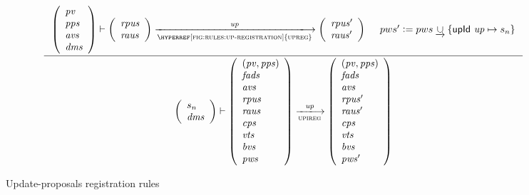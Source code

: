 \begin{figure}[htb]
  \begin{equation}
    \label{eq:rule:upi-reg-interface}
    \inference
    {
      {\left(
        \begin{array}{l}
          \var{pv}\\
          \var{pps}\\
          \var{avs}\\
          \var{dms}
        \end{array}
      \right)}
      \vdash
      {
        \left(
          \begin{array}{l}
            \var{rpus}\\
            \var{raus}
          \end{array}
        \right)
      }
      \trans{\hyperref[fig:rules:up-registration]{upreg}}{\var{up}}
      {
        \left(
          \begin{array}{l}
            \var{rpus'}\\
            \var{raus'}
          \end{array}
        \right)
      }
      &
      pws' \leteq pws \unionoverrideRight \{ \upId{up} \mapsto s_n\}
    }
    {
      {\left(
        \begin{array}{l}
          s_n\\
          \var{dms}
        \end{array}
      \right)}
      \vdash
      {
        \left(
          \begin{array}{l}
            (\var{pv}, \var{pps})\\
            \var{fads}\\
            \var{avs}\\
            \var{rpus}\\
            \var{raus}\\
            \var{cps}\\
            \var{vts}\\
            \var{bvs}\\
            \var{pws}
          \end{array}
        \right)
      }
      \trans{upireg}{\var{up}}
      {
        \left(
          \begin{array}{l}
            (\var{pv}, \var{pps})\\
            \var{fads}\\
            \var{avs}\\
            \var{rpus'}\\
            \var{raus'}\\
            \var{cps}\\
            \var{vts}\\
            \var{bvs}\\
            \var{pws'}
          \end{array}
        \right)
      }
    }
  \end{equation}
  \caption{Update-proposals registration rules}
  \label{fig:rules:upi-reg-interface}
\end{figure}

